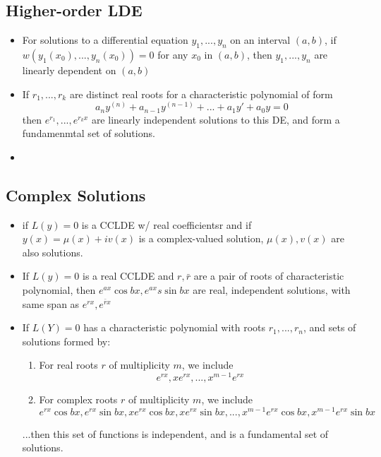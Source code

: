 \documentclass[10pt,letterpaper]{article}
\begin{document}
\subsection*{Higher-order LDE}

\begin{itemize}
\item For solutions to a differential equation $y_1,...,y_n$ on an interval $(a,b)$, if $w(y_1(x_0),...,y_n(x_0))=0$ for any $x_0$ in $(a,b)$, then $y_1,...,y_n$ are linearly dependent on $(a,b)$

\item If $r_1,...,r_k$ are distinct real roots for a characteristic polynomial of form 
$$a_ny^{(n)}+a_{n-1}y^{(n-1)}+...+a_1y'+a_0y=0$$
then $e^{r_1},...,e^{r_kx}$ are linearly independent solutions to this DE, and form a fundamenmtal set of solutions. 

\item 

\end{itemize}


\subsection*{Complex Solutions}
\begin{itemize}

\item if $L(y)=0$ is a CCLDE w/ real coefficientsr and if $y(x) = \mu(x) + iv(x)$ is a complex-valued solution, $\mu(x), v(x)$ are also solutions. 

\item If $L(y)=0$ is a real CCLDE and $r, \bar{r}$ are a pair of roots of characteristic polynomial, then 
$e^{ax}\cos bx, e^{ax}s\sin bx$ are real, independent solutions, with same span as $e^{rx}, e^{\bar{r}x}$

\item If $L(Y)=0$ has a characteristic polynomial with roots $r_1, ...,r_n$, and sets of solutions formed by: 
\begin{enumerate}
\item For real roots $r$ of multiplicity $m$, we include 
$$e^{rx}, xe^{rx}, ..., x^{m-1}e^{rx}$$
\item For complex roots $r$ of multiplicity $m$, we include
 $$e^{rx}\cos bx, e^{rx}\sin bx, xe^{rx}\cos bx, xe^{rx}\sin bx , ..., x^{m-1}e^{rx}\cos bx, x^{m-1}e^{rx}\sin bx$$
\end{enumerate}
...then this set of functions is independent, and is a fundamental set of solutions. 


\end{itemize}
\end{document}
